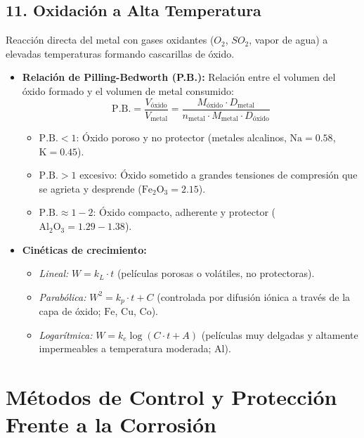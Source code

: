 \subsection{11. Oxidación a Alta Temperatura}
Reacción directa del metal con gases oxidantes ($O_2$, $SO_2$, vapor de agua) a elevadas temperaturas formando cascarillas de óxido.
\begin{itemize}
    \item \textbf{Relación de Pilling-Bedworth (P.B.):} Relación entre el volumen del óxido formado y el volumen de metal consumido:
          \begin{equation}
              \text{P.B.} = \frac{V_{\text{óxido}}}{V_{\text{metal}}} = \frac{M_{\text{óxido}} \cdot D_{\text{metal}}}{n_{\text{metal}} \cdot M_{\text{metal}} \cdot D_{\text{óxido}}}
              \label{eq:pilling_bedworth}
          \end{equation}
          \begin{itemize}
              \item $\text{P.B.} < 1$: Óxido poroso y no protector (metales alcalinos, $\text{Na} = 0.58$, $\text{K} = 0.45$).
              \item $\text{P.B.} > 1$ excesivo: Óxido sometido a grandes tensiones de compresión que se agrieta y desprende ($\text{Fe}_2\text{O}_3 = 2.15$).
              \item $\text{P.B.} \approx 1 - 2$: Óxido compacto, adherente y protector ($\text{Al}_2\text{O}_3 = 1.29 - 1.38$).
          \end{itemize}
    \item \textbf{Cinéticas de crecimiento:}
          \begin{itemize}
              \item \textit{Lineal:} $W = k_L \cdot t$ (películas porosas o volátiles, no protectoras).
              \item \textit{Parabólica:} $W^2 = k_p \cdot t + C$ (controlada por difusión iónica a través de la capa de óxido; $\text{Fe}$, $\text{Cu}$, $\text{Co}$).
              \item \textit{Logarítmica:} $W = k_e \log(C\cdot t + A)$ (películas muy delgadas y altamente impermeables a temperatura moderada; $\text{Al}$).
          \end{itemize}
\end{itemize}

\section{Métodos de Control y Protección Frente a la Corrosión}

